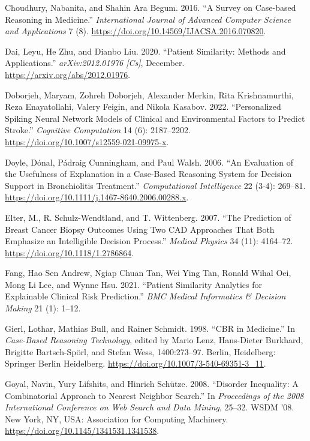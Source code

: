 \documentclass{article}
\newlength{\cslhangindent}
\newlength{\cslentryspacingunit} %
\newenvironment{CSLReferences}[2] %
 {%
  \setlength{\parindent}{0pt}
  \ifodd #1
  \let\oldpar\par
  \def\par{\hangindent=\cslhangindent\oldpar}
  \fi
  \setlength{\parskip}{#2\cslentryspacingunit}
 }%
 {}
\begin{document}
\begin{CSLReferences}{1}{0}
\leavevmode{}%
Choudhury, Nabanita, and Shahin Ara Begum. 2016. {``A {Survey} on
{Case-based Reasoning} in {Medicine}.''} \emph{International Journal of
Advanced Computer Science and Applications} 7 (8).
\url{https://doi.org/10.14569/IJACSA.2016.070820}.

\leavevmode{}%
Dai, Leyu, He Zhu, and Dianbo Liu. 2020. {``Patient Similarity: Methods
and Applications.''} \emph{arXiv:2012.01976 {[}Cs{]}}, December.
\url{https://arxiv.org/abs/2012.01976}.

\leavevmode{}%
Doborjeh, Maryam, Zohreh Doborjeh, Alexander Merkin, Rita Krishnamurthi,
Reza Enayatollahi, Valery Feigin, and Nikola Kasabov. 2022.
{``Personalized {Spiking Neural Network Models} of {Clinical} and
{Environmental Factors} to {Predict Stroke}.''} \emph{Cognitive
Computation} 14 (6): 2187--2202.
\url{https://doi.org/10.1007/s12559-021-09975-x}.

\leavevmode{}%
Doyle, Dónal, Pádraig Cunningham, and Paul Walsh. 2006. {``An Evaluation
of the Usefulness of Explanation in a Case-Based Reasoning System for
Decision Support in Bronchiolitis Treatment.''} \emph{Computational
Intelligence} 22 (3-4): 269--81.
\url{https://doi.org/10.1111/j.1467-8640.2006.00288.x}.

\leavevmode{}%
Elter, M., R. Schulz-Wendtland, and T. Wittenberg. 2007. {``The
Prediction of Breast Cancer Biopsy Outcomes Using Two {CAD} Approaches
That Both Emphasize an Intelligible Decision Process.''} \emph{Medical
Physics} 34 (11): 4164--72. \url{https://doi.org/10.1118/1.2786864}.

\leavevmode{}%
Fang, Hao Sen Andrew, Ngiap Chuan Tan, Wei Ying Tan, Ronald Wihal Oei,
Mong Li Lee, and Wynne Hsu. 2021. {``Patient Similarity Analytics for
Explainable Clinical Risk Prediction.''} \emph{BMC Medical Informatics
\& Decision Making} 21 (1): 1--12.

\leavevmode{}%
Gierl, Lothar, Mathias Bull, and Rainer Schmidt. 1998. {``{CBR} in
{Medicine}.''} In \emph{Case-{Based Reasoning Technology}}, edited by
Mario Lenz, Hans-Dieter Burkhard, Brigitte Bartsch-Spörl, and Stefan
Wess, 1400:273--97. Berlin, Heidelberg: Springer Berlin Heidelberg.
\url{https://doi.org/10.1007/3-540-69351-3_11}.

\leavevmode{}%
Goyal, Navin, Yury Lifshits, and Hinrich Schütze. 2008. {``Disorder
Inequality: A Combinatorial Approach to Nearest Neighbor Search.''} In
\emph{Proceedings of the 2008 {International Conference} on {Web Search}
and {Data Mining}}, 25--32. {WSDM} '08. New York, NY, USA: Association
for Computing Machinery. \url{https://doi.org/10.1145/1341531.1341538}.


\end{CSLReferences}
\end{document}
